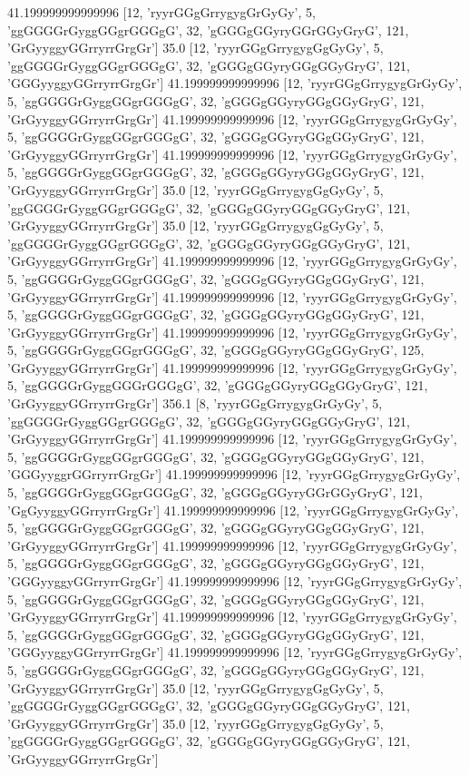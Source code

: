 41.199999999999996 [12, 'ryyrGGgGrrygygGrGyGy', 5, 'ggGGGGrGyggGGgrGGGgG', 32, 'gGGGgGGyryGGrGGyGryG', 121, 'GrGyyggyGGrryrrGrgGr']
35.0 [12, 'ryyrGGgGrrygygGgGyGy', 5, 'ggGGGGrGyggGGgrGGGgG', 32, 'gGGGgGGyryGGgGGyGryG', 121, 'GGGyyggyGGrryrrGrgGr']
41.199999999999996 [12, 'ryyrGGgGrrygygGrGyGy', 5, 'ggGGGGrGyggGGgrGGGgG', 32, 'gGGGgGGyryGGgGGyGryG', 121, 'GrGyyggyGGrryrrGrgGr']
41.199999999999996 [12, 'ryyrGGgGrrygygGrGyGy', 5, 'ggGGGGrGyggGGgrGGGgG', 32, 'gGGGgGGyryGGgGGyGryG', 121, 'GrGyyggyGGrryrrGrgGr']
41.199999999999996 [12, 'ryyrGGgGrrygygGrGyGy', 5, 'ggGGGGrGyggGGgrGGGgG', 32, 'gGGGgGGyryGGgGGyGryG', 121, 'GrGyyggyGGrryrrGrgGr']
35.0 [12, 'ryyrGGgGrrygygGgGyGy', 5, 'ggGGGGrGyggGGgrGGGgG', 32, 'gGGGgGGyryGGgGGyGryG', 121, 'GrGyyggyGGrryrrGrgGr']
35.0 [12, 'ryyrGGgGrrygygGgGyGy', 5, 'ggGGGGrGyggGGgrGGGgG', 32, 'gGGGgGGyryGGgGGyGryG', 121, 'GrGyyggyGGrryrrGrgGr']
41.199999999999996 [12, 'ryyrGGgGrrygygGrGyGy', 5, 'ggGGGGrGyggGGgrGGGgG', 32, 'gGGGgGGyryGGgGGyGryG', 121, 'GrGyyggyGGrryrrGrgGr']
41.199999999999996 [12, 'ryyrGGgGrrygygGrGyGy', 5, 'ggGGGGrGyggGGgrGGGgG', 32, 'gGGGgGGyryGGgGGyGryG', 121, 'GrGyyggyGGrryrrGrgGr']
41.199999999999996 [12, 'ryyrGGgGrrygygGrGyGy', 5, 'ggGGGGrGyggGGgrGGGgG', 32, 'gGGGgGGyryGGgGGyGryG', 125, 'GrGyyggyGGrryrrGrgGr']
41.199999999999996 [12, 'ryyrGGgGrrygygGrGyGy', 5, 'ggGGGGrGyggGGGrGGGgG', 32, 'gGGGgGGyryGGgGGyGryG', 121, 'GrGyyggyGGrryrrGrgGr']
356.1 [8, 'ryyrGGgGrrygygGrGyGy', 5, 'ggGGGGrGyggGGgrGGGgG', 32, 'gGGGgGGyryGGgGGyGryG', 121, 'GrGyyggyGGrryrrGrgGr']
41.199999999999996 [12, 'ryyrGGgGrrygygGrGyGy', 5, 'ggGGGGrGyggGGgrGGGgG', 32, 'gGGGgGGyryGGgGGyGryG', 121, 'GGGyyggrGGrryrrGrgGr']
41.199999999999996 [12, 'ryyrGGgGrrygygGrGyGy', 5, 'ggGGGGrGyggGGgrGGGgG', 32, 'gGGGgGGyryGGrGGyGryG', 121, 'GgGyyggyGGrryrrGrgGr']
41.199999999999996 [12, 'ryyrGGgGrrygygGrGyGy', 5, 'ggGGGGrGyggGGgrGGGgG', 32, 'gGGGgGGyryGGgGGyGryG', 121, 'GrGyyggyGGrryrrGrgGr']
41.199999999999996 [12, 'ryyrGGgGrrygygGrGyGy', 5, 'ggGGGGrGyggGGgrGGGgG', 32, 'gGGGgGGyryGGgGGyGryG', 121, 'GGGyyggyGGrryrrGrgGr']
41.199999999999996 [12, 'ryyrGGgGrrygygGrGyGy', 5, 'ggGGGGrGyggGGgrGGGgG', 32, 'gGGGgGGyryGGgGGyGryG', 121, 'GrGyyggyGGrryrrGrgGr']
41.199999999999996 [12, 'ryyrGGgGrrygygGrGyGy', 5, 'ggGGGGrGyggGGgrGGGgG', 32, 'gGGGgGGyryGGgGGyGryG', 121, 'GGGyyggyGGrryrrGrgGr']
41.199999999999996 [12, 'ryyrGGgGrrygygGrGyGy', 5, 'ggGGGGrGyggGGgrGGGgG', 32, 'gGGGgGGyryGGgGGyGryG', 121, 'GrGyyggyGGrryrrGrgGr']
35.0 [12, 'ryyrGGgGrrygygGgGyGy', 5, 'ggGGGGrGyggGGgrGGGgG', 32, 'gGGGgGGyryGGgGGyGryG', 121, 'GrGyyggyGGrryrrGrgGr']
35.0 [12, 'ryyrGGgGrrygygGgGyGy', 5, 'ggGGGGrGyggGGgrGGGgG', 32, 'gGGGgGGyryGGgGGyGryG', 121, 'GrGyyggyGGrryrrGrgGr']
